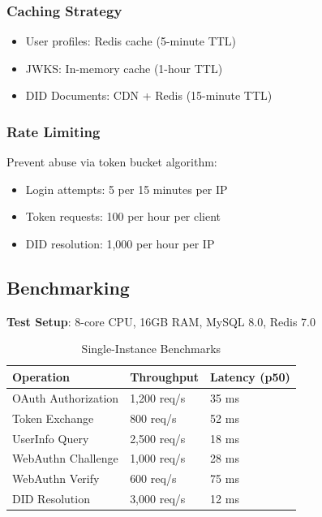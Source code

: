 \subsubsection{Caching Strategy}

\begin{itemize}
  \item User profiles: Redis cache (5-minute TTL)
  \item JWKS: In-memory cache (1-hour TTL)
  \item DID Documents: CDN + Redis (15-minute TTL)
\end{itemize}

\subsubsection{Rate Limiting}

Prevent abuse via token bucket algorithm:
\begin{itemize}
  \item Login attempts: 5 per 15 minutes per IP
  \item Token requests: 100 per hour per client
  \item DID resolution: 1,000 per hour per IP
\end{itemize}

\subsection{Benchmarking}

\textbf{Test Setup}: 8-core CPU, 16GB RAM, MySQL 8.0, Redis 7.0

\begin{table}[h]
\centering
\begin{tabular}{@{}lll@{}}
\toprule
\textbf{Operation} & \textbf{Throughput} & \textbf{Latency (p50)} \\ \midrule
OAuth Authorization & 1,200 req/s & 35 ms \\
Token Exchange & 800 req/s & 52 ms \\
UserInfo Query & 2,500 req/s & 18 ms \\
WebAuthn Challenge & 1,000 req/s & 28 ms \\
WebAuthn Verify & 600 req/s & 75 ms \\
DID Resolution & 3,000 req/s & 12 ms \\ \bottomrule
\end{tabular}
\caption{Single-Instance Benchmarks}
\end{table}

